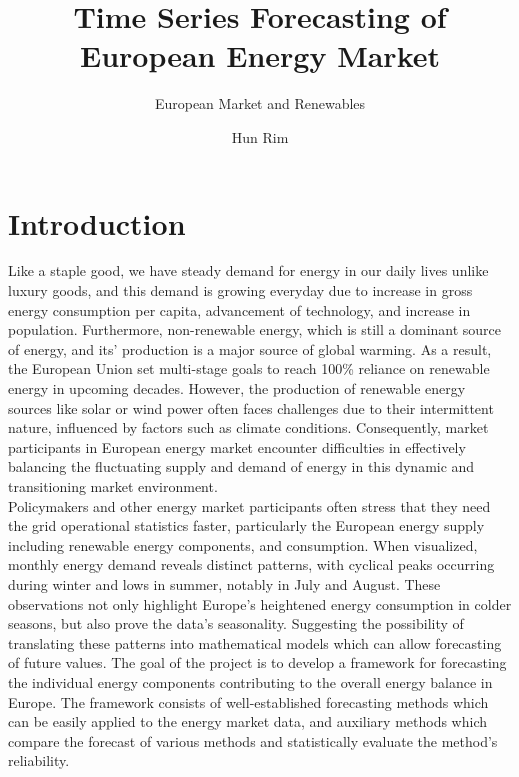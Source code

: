 \documentclass[]{usiinfbachelorproject}
\author{Hun Rim}
\title{Time Series Forecasting of European Energy Market}
\subtitle{European Market and Renewables}
\begin{document}
\maketitle

\section{Introduction} \label{introduction}

Like a staple good, we have steady demand for energy in our daily lives unlike luxury goods, and this demand is growing everyday due to increase in gross energy consumption per capita, advancement of technology, and increase in population. Furthermore, non-renewable energy, which is still a dominant source of energy, and its' production is a major source of global warming. As a result, the European Union set multi-stage goals to reach 100\% reliance on renewable energy in upcoming decades. However, the production of renewable energy sources like solar or wind power often faces challenges due to their intermittent nature, influenced by factors such as climate conditions. Consequently, market participants in European energy market encounter difficulties in effectively balancing the fluctuating supply and demand of energy in this dynamic and transitioning market environment.   \\ 

Policymakers and other energy market participants often stress that they need the grid operational statistics faster, particularly the European energy supply including renewable energy components, and consumption. When visualized, monthly energy demand reveals distinct patterns, with cyclical peaks occurring during winter and lows in summer, notably in July and August. These observations not only highlight Europe's heightened energy consumption in colder seasons, but also prove the data's seasonality. Suggesting the possibility of translating these patterns into mathematical models which can allow forecasting of future values. The goal of the project is to develop a framework for forecasting the individual energy components contributing to the overall energy balance in Europe. The framework consists of well-established forecasting methods which can be easily applied to the energy market data, and auxiliary methods which compare the forecast of various methods and statistically evaluate the method's reliability. \\
\end{document}

